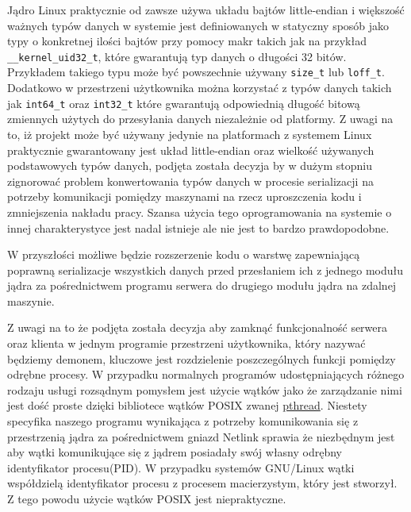 \documentclass[10pt]{article}
\begin{document}
Jądro Linux praktycznie od zawsze używa układu bajtów little-endian i
większość ważnych typów danych w systemie jest definiowanych w statyczny
sposób jako typy o konkretnej ilości bajtów przy pomocy makr takich jak
na przykład \texttt{\_\_kernel\_uid32\_t}, które gwarantują typ danych o
długości 32 bitów. Przykładem takiego typu może być powszechnie używany
\texttt{size\_t} lub \texttt{loff\_t}. Dodatkowo w przestrzeni
użytkownika można korzystać z typów danych takich jak \texttt{int64\_t}
oraz \texttt{int32\_t} które gwarantują odpowiednią długość bitową
zmiennych użytych do przesyłania danych niezależnie od platformy. Z
uwagi na to, iż projekt może być używany jedynie na platformach z
systemem Linux praktycznie gwarantowany jest układ little-endian oraz
wielkość używanych podstawowych typów danych, podjęta została decyzja by
w dużym stopniu zignorować problem konwertowania typów danych w procesie
serializacji na potrzeby komunikacji pomiędzy maszynami na rzecz
uproszczenia kodu i zmniejszenia nakładu pracy. Szansa użycia tego
oprogramowania na systemie o innej charakterystyce jest nadal istnieje
ale nie jest to bardzo prawdopodobne.

W przyszłości możliwe będzie rozszerzenie kodu o warstwę zapewniającą
poprawną serializacje wszystkich danych przed przesłaniem ich z jednego
modułu jądra za pośrednictwem programu serwera do drugiego modułu jądra
na zdalnej maszynie.


Z uwagi na to że podjęta została decyzja aby zamknąć funkcjonalność
serwera oraz klienta w jednym programie przestrzeni użytkownika, który
nazywać będziemy demonem, kluczowe jest rozdzielenie poszczególnych
funkcji pomiędzy odrębne procesy. W przypadku normalnych programów
udostępniających różnego rodzaju usługi rozsądnym pomysłem jest użycie
wątków jako że zarządzanie nimi jest dość proste dzięki bibliotece
wątków POSIX zwanej
\href{https://computing.llnl.gov/tutorials/pthreads/}{pthread}. Niestety
specyfika naszego programu wynikająca z potrzeby komunikowania się z
przestrzenią jądra za pośrednictwem gniazd Netlink sprawia że niezbędnym
jest aby wątki komunikujące się z jądrem posiadały swój własny odrębny
identyfikator procesu(PID). W przypadku systemów GNU/Linux wątki
współdzielą identyfikator procesu z procesem macierzystym, który jest
stworzył. Z tego powodu użycie wątków POSIX jest niepraktyczne.
\end{document}
